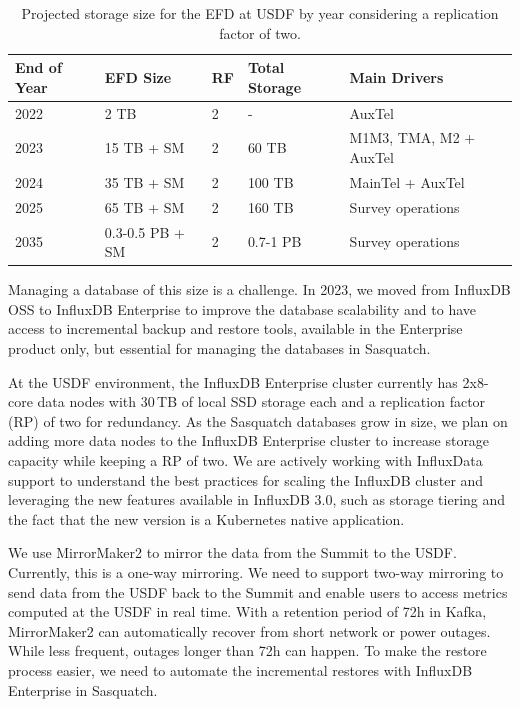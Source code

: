 \begin{table}[ht]
    \centering
    \caption{Projected storage size for the EFD at USDF by year considering a replication factor of two.}
    \begin{tabular}{@{}lllll@{}}
        \toprule
        \textbf{End of Year} & \textbf{EFD Size} & \textbf{RF} & \textbf{Total Storage} & \textbf{Main Drivers} \\
        \midrule
        2022 & 2 TB & 2 & - & AuxTel \\
        2023 & 15 TB + SM & 2 & 60 TB & M1M3, TMA, M2 + AuxTel \\
        2024 & 35 TB + SM & 2 & 100 TB & MainTel + AuxTel \\
        2025 & 65 TB + SM & 2 & 160 TB & Survey operations \\
        2035 & 0.3-0.5 PB + SM & 2 & 0.7-1 PB & Survey operations \\
        \bottomrule
    \end{tabular}
\end{table}

Managing a database of this size is a challenge. In 2023, we moved from InfluxDB OSS to InfluxDB Enterprise to improve the database scalability and to have access to incremental backup and restore tools, available in the Enterprise product only, but essential for managing the databases in Sasquatch.

At the USDF environment, the InfluxDB Enterprise cluster currently has 2x8-core data nodes with 30\,TB of local SSD storage each and a replication factor (RP) of two for redundancy. As the Sasquatch databases grow in size, we plan on adding more data nodes to the InfluxDB Enterprise cluster to increase storage capacity while keeping a RP of two. We are actively working with InfluxData support to understand the best practices for scaling the InfluxDB cluster and leveraging the new features available in InfluxDB 3.0, such as storage tiering and the fact that the new version is a Kubernetes native application.

We use MirrorMaker2 to mirror the data from the Summit to the USDF. Currently, this is a one-way mirroring. We need to support two-way mirroring to send data from the USDF back to the Summit and enable users to access metrics computed at the USDF in real time. With a retention period of 72h in Kafka, MirrorMaker2 can automatically recover from short network or power outages. While less frequent, outages longer than 72h can happen. To make the restore process easier, we need to automate the incremental restores with InfluxDB Enterprise in Sasquatch.

